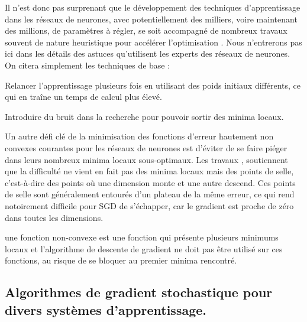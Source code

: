 	Il n'est donc pas surprenant que le développement des techniques d'apprentissage dans les réseaux de neurones, avec potentiellement des milliers, voire maintenant des millions, de paramètres à régler, se soit accompagné de nombreux travaux souvent de nature heuristique pour accélérer l'optimisation \cite{antoine2018apprentissage}. Nous n'entrerons pas ici dans les détails des astuces qu'utilisent les experts des réseaux de neurones. On citera simplement les techniques de base :
	
	\begin{list}{--}{}
		\item Relancer l'apprentissage plusieurs fois en utilisant des poids initiaux différents, ce qui en traîne un temps de calcul plus élevé.
		\item Introduire du bruit dans la recherche pour pouvoir sortir des minima locaux.
	\end{list}

	
	
	Un autre défi clé de la minimisation des fonctions d'erreur hautement non convexes courantes pour les réseaux de neurones est d'éviter de se faire piéger dans leurs nombreux minima locaux sous-optimaux. Les travaux \cite{ruder2016overview, bottou2018optimization, bottou2012stochastic}, soutiennent que la difficulté ne vient en fait pas des minima locaux mais des points de selle, c'est-à-dire des points où une dimension monte et une autre descend. Ces points de selle sont généralement entourés d'un plateau de la même erreur, ce qui rend notoirement difficile pour SGD de s'échapper, car le gradient est proche de zéro dans toutes les dimensions.
	
	une fonction non-convexe est une fonction qui présente plusieurs minimums locaux et l’algorithme de descente de gradient ne doit pas être utilisé sur ces fonctions, au risque de se bloquer au premier minima rencontré.	
	
	
	
	
	
	\subsection*{Algorithmes de gradient stochastique pour divers systèmes d'apprentissage.}
	
